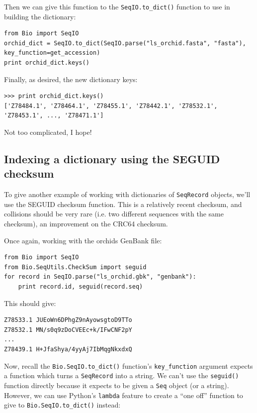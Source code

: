 \documentclass{report}
\begin{document}
\noindent Then we can give this function to the \verb|SeqIO.to_dict()| function to use in building the dictionary:

\begin{verbatim}
from Bio import SeqIO
orchid_dict = SeqIO.to_dict(SeqIO.parse("ls_orchid.fasta", "fasta"), key_function=get_accession)
print orchid_dict.keys()
\end{verbatim}

\noindent Finally, as desired, the new dictionary keys:

\begin{verbatim}
>>> print orchid_dict.keys()
['Z78484.1', 'Z78464.1', 'Z78455.1', 'Z78442.1', 'Z78532.1', 'Z78453.1', ..., 'Z78471.1']
\end{verbatim}

\noindent Not too complicated, I hope!

\subsection{Indexing a dictionary using the SEGUID checksum}

To give another example of working with dictionaries of \verb|SeqRecord| objects, we'll use the SEGUID checksum function.  This is a relatively recent checksum, and collisions should be very rare (i.e. two different sequences with the same checksum), an improvement on the CRC64 checksum.

Once again, working with the orchids GenBank file:

\begin{verbatim}
from Bio import SeqIO
from Bio.SeqUtils.CheckSum import seguid
for record in SeqIO.parse("ls_orchid.gbk", "genbank"):
    print record.id, seguid(record.seq)
\end{verbatim}

\noindent This should give:

\begin{verbatim}
Z78533.1 JUEoWn6DPhgZ9nAyowsgtoD9TTo
Z78532.1 MN/s0q9zDoCVEEc+k/IFwCNF2pY
...
Z78439.1 H+JfaShya/4yyAj7IbMqgNkxdxQ
\end{verbatim}

Now, recall the \verb|Bio.SeqIO.to_dict()| function's \verb|key_function| argument expects a function which turns a \verb|SeqRecord| into a string.  We can't use the \verb|seguid()| function directly because it expects to be given a \verb|Seq| object (or a string).  However, we can use Python's \verb|lambda| feature to create a ``one off'' function to give to \verb|Bio.SeqIO.to_dict()| instead:
\end{document}
